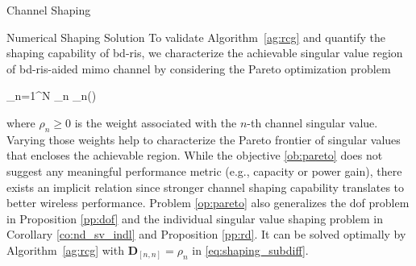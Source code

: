 \documentclass[journal]{IEEEtran}
\begin{document}
\begin{section}{Channel Shaping}
\begin{subsection}{Numerical Shaping Solution}
		To validate Algorithm~\ref{ag:rcg} and quantify the shaping capability of \gls{bd}-\gls{ris}, we characterize the achievable singular value region of \gls{bd}-\gls{ris}-aided \gls{mimo} channel by considering the Pareto optimization problem
		\begin{maxi!}
			{\scriptstyle{\mathbf{\Theta}}}{\sum_{n=1}^N \rho_n \sigma_n()}{\label{op:pareto}}{\label{ob:pareto}}
		\end{maxi!}
		where $\rho_n \ge 0$ is the weight associated with the $n$-th channel singular value.
		Varying those weights help to characterize the Pareto frontier of singular values that encloses the achievable region.
		While the objective \eqref{ob:pareto} does not suggest any meaningful performance metric (e.g., capacity or power gain), there exists an implicit relation since stronger channel shaping capability translates to better wireless performance.
		Problem \eqref{op:pareto} also generalizes the \gls{dof} problem in Proposition \ref{pp:dof} and the individual singular value shaping problem in Corollary \ref{co:nd_sv_indl} and Proposition \ref{pp:rd}.
		It can be solved optimally by Algorithm~\ref{ag:rcg} with $\mathbf{D}_{[n,n]} = \rho_n$ in \eqref{eq:shaping_subdiff}.
	\end{subsection}
\end{section}
\end{document}
